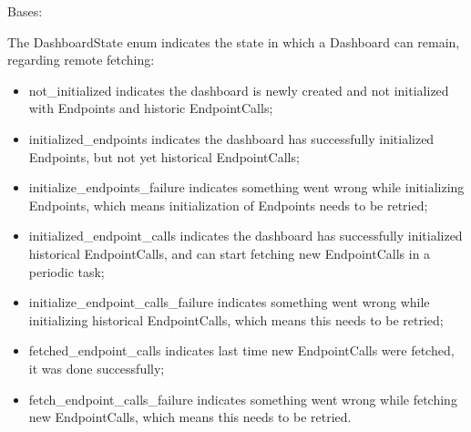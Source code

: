 \documentclass[letterpaper,10pt,english]{sphinxmanual}
\begin{document}

\begin{fulllineitems}
\label{\detokenize{pydash_app.dashboard.entity:pydash_app.dashboard.entity.DashboardState}}
Bases: 

The DashboardState enum indicates the state in which a Dashboard can remain, regarding remote fetching:
\begin{itemize}
\item {} 
not\_initialized indicates the dashboard is newly created and not initialized with Endpoints and
historic EndpointCalls;

\item {} 
initialized\_endpoints indicates the dashboard has successfully initialized Endpoints,
but not yet historical EndpointCalls;

\item {} 
initialize\_endpoints\_failure indicates something went wrong while initializing Endpoints, which means
initialization of Endpoints needs to be retried;

\item {} 
initialized\_endpoint\_calls indicates the dashboard has successfully initialized historical EndpointCalls,
and can start fetching new EndpointCalls in a periodic task;

\item {} 
initialize\_endpoint\_calls\_failure indicates something went wrong while initializing historical EndpointCalls,
which means this needs to be retried;

\item {} 
fetched\_endpoint\_calls indicates last time new EndpointCalls were fetched, it was done successfully;

\item {} 
fetch\_endpoint\_calls\_failure indicates something went wrong while fetching new EndpointCalls,
which means this needs to be retried.

\end{itemize}

\begin{fulllineitems}
\label{\detokenize{pydash_app.dashboard.entity:pydash_app.dashboard.entity.DashboardState.fetch_endpoint_calls_failure}}
\end{fulllineitems}


\end{fulllineitems}
\end{document}
